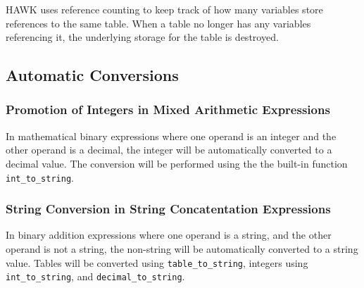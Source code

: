 \documentclass[12pt]{article}
\begin{document}
HAWK uses reference counting to keep track of how many variables store references to the same table. When a table no longer has any variables referencing it, the underlying storage for the table is destroyed.  

\subsection*{Automatic Conversions}

\subsubsection*{Promotion of Integers in Mixed Arithmetic Expressions}

In mathematical binary expressions where one operand is an integer and the other operand is a decimal, the integer will be automatically converted to a decimal value. The conversion will be performed using the the built-in function \texttt{int\_to\_string}.

\subsubsection*{String Conversion in String Concatentation Expressions}

In binary addition expressions where one operand is a string, and the other operand is not a string, the non-string will be automatically converted to a string value. Tables will be converted using \texttt{table\_to\_string}, integers using \texttt{int\_to\_string}, and \texttt{decimal\_to\_string}.
\end{document}
